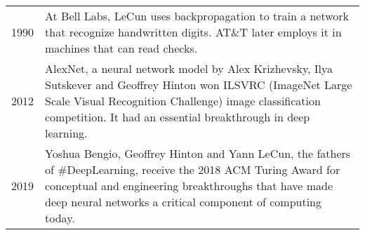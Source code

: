 \begin{table}
\begin{tabular}{@{\,}r <{\hskip 0pt} !{\foo} >{\raggedright\arraybackslash}p{14cm}}
1990 & At Bell Labs, LeCun uses backpropagation to train a network that recognize handwritten digits. AT\&T later employs it in machines that can read checks. \\


2012 &  AlexNet, a neural network model by Alex Krizhevsky, Ilya Sutskever and Geoffrey Hinton won ILSVRC (ImageNet Large Scale Visual Recognition Challenge) image classification competition. It had an essential breakthrough in deep learning. \\

2019 & Yoshua Bengio, Geoffrey Hinton and Yann LeCun, the fathers of #DeepLearning, receive the 2018 ACM Turing Award for conceptual and engineering breakthroughs that have made deep neural networks a critical component of computing today.

\end{tabular}
\end{table}
